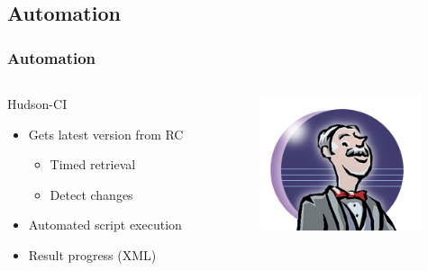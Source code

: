 \documentclass[british,10pt]{beamer}
\begin{document}
\subsection{Automation}
\begin{frame}\frametitle{Automation}
\begin{columns}
\begin{column}{0.6\textwidth}
Hudson-CI
\begin{itemize}
\item Gets latest version from RC
\begin{itemize}
\item Timed retrieval
\item Detect changes
\end{itemize}
\item Automated script execution
\item Result progress (XML)
\end{itemize}
\end{column}
\includegraphics[width=0.8\textwidth]{images/hudson.png}
\end{columns}
\end{frame}
\end{document}
